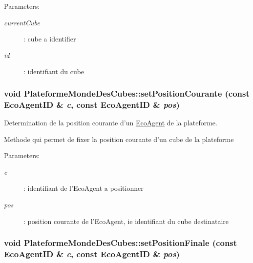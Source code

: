 \begin{Desc}
\item[Parameters:]
\begin{description}
\item[{\em currentCube}]: cube a identifier \item[{\em id}]: identifiant du cube \end{description}
\end{Desc}
\hypertarget{classPlateformeMondeDesCubes_ecc518787fb8231be37e7b8eb3c5390e}{
\subsubsection[{setPositionCourante}]{\setlength{\rightskip}{0pt plus 5cm}void PlateformeMondeDesCubes::setPositionCourante (const {\bf EcoAgentID} \& {\em c}, \/  const {\bf EcoAgentID} \& {\em pos})}}
\label{classPlateformeMondeDesCubes_ecc518787fb8231be37e7b8eb3c5390e}


Determination de la position courante d'un \hyperlink{classEcoAgent}{EcoAgent} de la plateforme. 

Methode qui permet de fixer la position courante d'un cube de la plateforme

\begin{Desc}
\item[Parameters:]
\begin{description}
\item[{\em c}]: identifiant de l'EcoAgent a positionner \item[{\em pos}]: position courante de l'EcoAgent, ie identifiant du cube destinataire \end{description}
\end{Desc}
\hypertarget{classPlateformeMondeDesCubes_315f30b3c7c1e8bc9ec828a66a5813e5}{
\subsubsection[{setPositionFinale}]{\setlength{\rightskip}{0pt plus 5cm}void PlateformeMondeDesCubes::setPositionFinale (const {\bf EcoAgentID} \& {\em c}, \/  const {\bf EcoAgentID} \& {\em pos})}}
\label{classPlateformeMondeDesCubes_315f30b3c7c1e8bc9ec828a66a5813e5}


